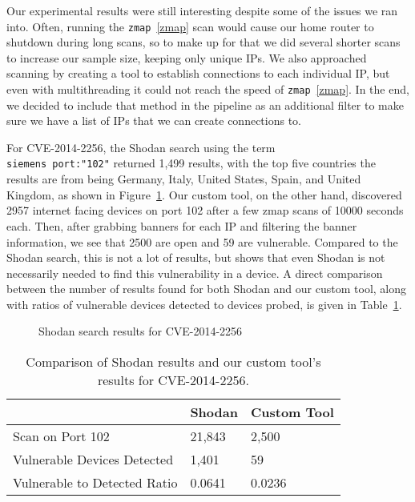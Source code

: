 Our experimental results were still interesting despite some of the issues
we ran into. Often, running the \verb|zmap|~\ref{zmap} scan would cause our
home router to shutdown during long scans, so to make up for that we did
several shorter scans to increase our sample size, keeping only unique IPs.
We also approached scanning by creating a tool to establish connections to
each individual IP, but even with multithreading it could not reach the speed
of \verb|zmap|~\ref{zmap}. In the end, we decided to include that method in
the pipeline as an additional filter to make sure we have a list of IPs
that we can create connections to.

For CVE-2014-2256, the Shodan search using the term \\\verb|siemens port:"102"| returned
1,499 results, with the top five countries the results are from being
Germany, Italy, United States, Spain, and United Kingdom, as shown in
Figure~\ref{fig:shodan-siemens}. Our custom tool, on the other hand,
discovered 2957 internet facing devices on port 102 after a few zmap scans
of 10000 seconds each. Then, after grabbing banners for each IP and filtering
the banner information, we see that 2500 are open and 59 are vulnerable. Compared
to the Shodan search, this is not a lot of results, but shows that even Shodan
is not necessarily needed to find this vulnerability in a device. A direct
comparison between the number of results found for both Shodan and our custom
tool, along with ratios of vulnerable devices detected to devices probed, is
given in Table~\ref{tab:cve-2014}.

\begin{figure}[!h]
\begin{center}
\caption{Shodan search results for CVE-2014-2256}
\label{fig:shodan-siemens}
\end{center}
\end{figure}

\begin{table}[!h]
\begin{tabular}{l|l|l}
                             & Shodan & Custom Tool \\ \hline
Scan on Port 102             & 21,843 & 2,500       \\ \hline
Vulnerable Devices Detected  & 1,401  & 59          \\ \hline
Vulnerable to Detected Ratio & 0.0641 & 0.0236      \\
\end{tabular}
\caption{Comparison of Shodan results and our custom tool's results for CVE-2014-2256.}
\label{tab:cve-2014}
\end{table}

